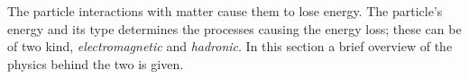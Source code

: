 The particle interactions with matter cause them to lose energy. The particle's
energy and its type determines the processes causing the energy loss; these can
be of two kind, \emph{electromagnetic} and \emph{hadronic}. In this section a
brief overview of the physics behind the two is given.
